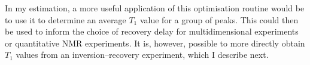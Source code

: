 In my estimation, a more useful application of this optimisation routine would be to use it to determine an average $T_1$ value for a group of peaks.
This could then be used to inform the choice of recovery delay for multidimensional experiments\autocite{Reynolds2002JNP,Burns2021MRC} or quantitative NMR experiments\autocite{Pauli2005JNP,Giraudeau2014MRC}.
It is, however, possible to more directly obtain $T_1$ values from an inversion--recovery experiment, which I describe next.
